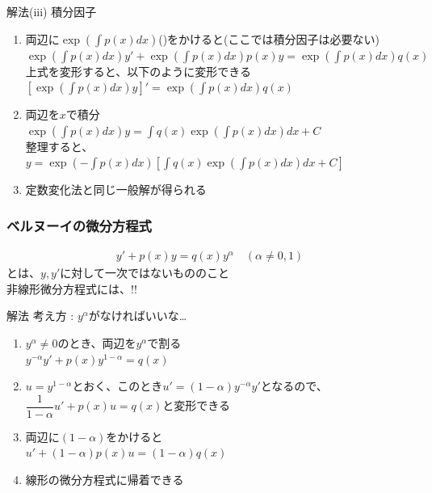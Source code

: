 \documentclass[a4paper]{jsarticle}
\begin{document}
\begin{itembox}[l]{解法(iii) 積分因子}
    \begin{enumerate}[(1)]
        \item 両辺に$\exp{\left(\int p\left(x\right)dx\right)}$()をかけると(ここでは積分因子は必要ない)\\
              $\exp{\left(\int p\left(x\right)dx\right)}y'+\exp{\left(\int p\left(x\right)dx\right)}p\left(x\right)y=\exp{\left(\int p\left(x\right)dx\right)}q\left(x\right)$\\
              上式を変形すると、以下のように変形できる\\
              $\left[\exp{\left(\int p\left(x\right)dx\right)}y\right]'=\exp{\left(\int p\left(x\right)dx\right)}q\left(x\right)$
        \item 両辺を$x$で積分\\
              $\exp{\left(\int p\left(x\right)dx\right)}y=\int q\left(x\right)\exp{\left(\int p\left(x\right)dx\right)}dx+C$\\
              整理すると、\\
              $y=\exp{\left(-\int p\left(x\right)dx\right)}\left[\int q\left(x\right)\exp{\left(\int p\left(x\right)dx\right)}dx+C\right]$
        \item 定数変化法と同じ一般解が得られる
    \end{enumerate}
\end{itembox}
\subsubsection{ベルヌーイの微分方程式}
\begin{eqnarray*}
    y'+p\left(x\right)y=q\left(x\right)y^{\alpha}\quad\left(\alpha\neq 0,1\right)
\end{eqnarray*}
とは、$y,y'$に対して一次ではないもののこと\\
非線形微分方程式には、!!
\begin{itembox}[l]{解法}
    考え方 : $y^{\alpha}$がなければいいな\dots
    \begin{enumerate}[(1)]
        \item $y^{\alpha}\neq 0$のとき、両辺を$y^{\alpha}$で割る\\
              $y^{-\alpha} y'+p\left(x\right)y^{1-\alpha}=q\left(x\right)$
        \item $u=y^{1-\alpha}$とおく、このとき$u'=\left(1-\alpha\right)y^{-\alpha}y'$となるので、\\
              $\dfrac{1}{1-\alpha}u'+p\left(x\right)u=q\left(x\right)$と変形できる
        \item 両辺に$\left(1-\alpha\right)$をかけると\\
              $u'+\left(1-\alpha\right)p\left(x\right)u=\left(1-\alpha\right)q\left(x\right)$
        \item 線形の微分方程式に帰着できる
    \end{enumerate}
\end{itembox}
\end{document}
